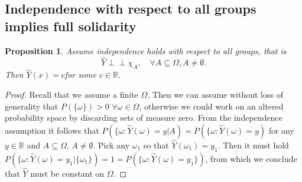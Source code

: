 \documentclass[11pt]{article} %
\newcommand{\indep}{\perp \!\!\! \perp}
\newtheorem{proposition}[theorem]{Proposition}
\begin{document}
\subsection{Independence with respect to all groups implies full solidarity}
\label{app:solidarityproof}
\begin{proposition}
    Assume independence holds with respect to all groups, that is
    \[
    \hat{Y} \indep \chi_A, \quad \forall A \subseteq \Omega, A \neq \emptyset.
    \]
    Then $\hat{Y}(x)=c$\thinspace for some $c \in \mathbb{R}$.
\end{proposition}
\begin{proof}
    Recall that we assume a finite $\Omega$. Then we can assume without loss of generality that $P(\{\omega\})>0$ $\forall \omega \in \Omega$, otherwise we could work on an altered probability space by discarding sets of measure zero. From the independence assumption it follows that $P(\{\omega \colon \hat{Y}(\omega) = y | A)=P(\{\omega \colon \hat{Y}(\omega)=y)$ for any $y \in \mathbb{R}$ and $A \subseteq \Omega$, $A \neq \emptyset$. Pick any $\omega_1$ so that $\hat{Y}(\omega_1)=y_1$. Then it must hold $P(\{\omega \colon \hat{Y}(\omega)=y_1|\{\omega_1\}) = 1 = P(\{\omega \colon \hat{Y}(\omega)=y_1\})$, from which we conclude that $\hat{Y}$ must be constant on $\Omega$.
\end{proof}
\end{document}
